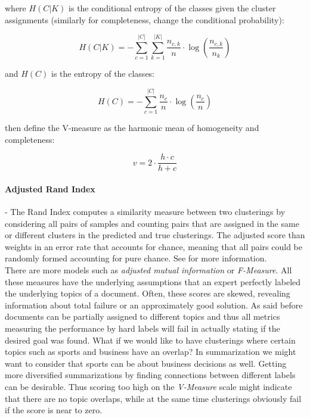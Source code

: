     where $H(C|K)$ is the conditional entropy of the classes given the cluster assignments (similarly for completeness, change the conditional probability):

      \begin{equation}
        H(C|K) = - \sum_{c=1}^{|C|} \sum_{k=1}^{|K|} \frac{n_{c,k}}{n}\cdot \log\left(\frac{n_{c,k}}{n_k}\right)
      \end{equation}

    and $H(C)$ is the entropy of the classes:

      \begin{equation}
        H(C) = - \sum_{c=1}^{|C|} \frac{n_c}{n} \cdot \log\left(\frac{n_c}{n}\right)
      \end{equation}

    \cite{VMeasure2007} then define the V-measure as the harmonic mean of homogeneity and completeness:

      \begin{equation}
        v = 2 \cdot \frac{h \cdot c}{h + c}
      \end{equation}

    \paragraph{Adjusted Rand Index} - The Rand Index computes a similarity measure between two clusterings by considering all pairs of samples and counting pairs that are assigned in the same or different clusters in the predicted and true clusterings. The adjusted score than weights in an error rate that accounts for chance, meaning that all pairs could be randomly formed accounting for pure chance. See \cite{RandIndex1971} for more information.\\

  There are more models such as \emph{adjusted mutual information} or \emph{F-Measure}. All these measures have the underlying assumptions that an expert perfectly labeled the underlying topics of a document. Often, these scores are skewed, revealing information about total failure or an approximately good solution. As said before documents can be partially assigned to different topics and thus all metrics measuring the performance by hard labels will fail in actually stating if the desired goal was found. What if we would like to have clusterings where certain topics such as sports and business have an overlap? In summarization we might want to consider that sports can be about business decisions as well. Getting more diversified summarizations by finding connections between different labels can be desirable. Thus scoring too high on the \emph{V-Measure} scale might indicate that there are no topic overlaps, while at the same time clusterings obviously fail if the score is near to zero.


